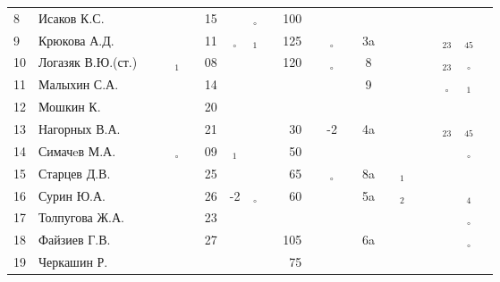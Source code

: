 \documentclass[a4paper,landscape,11pt]{article}
\newcommand*\OK{&\small \ding{51}$\!\!_\circ$} %
\newcommand*\Ok{&\small \ding{51}$\!\!_\circ$} %
\newcommand*\ok{&{\small\ding{51}}} %
\newcommand*\no{&{\small }} %
\newcommand*\da{&{\small\ding{48}$\!\!_1$}} %
\newcommand*\db{&{\small\ding{48}$\!\!_2$}} %
\newcommand*\bc{&{\small\ding{48}$\!\!_{23}$}} %
\newcommand*\dd{&{\small\ding{48}$\!\!_4$}} %
\newcommand*\De{&{\small\ding{48}$\!\!_{45}$}} %
\begin{document}
\begin{tabular}{l|l|ccccccccrccccccccccc}
 8& Исаков К.С.      \ok\ok\ok\ok&15\no\OK\ok&100\no\ok\ok \no\no\no\no\ok\no\no\no\\
 9& Крюкова А.Д.     \ok\ok\ok\ok&11\OK\da\ok&125\ok\Ok\ok& 3a\ok\ok\ok\ok\bc\De\ok\\
10& Логазяк В.Ю.(ст.)\ok\ok\da\ok&08\no\ok\ok&120\ok\Ok\ok&  8\ok\ok\ok\ok\bc\Ok\ok\\
\midrule
11& Малыхин С.А.     \ok\no\ok\ok&14\no\no\no \no\no\ok\ok&  9\no\no\no\ok\Ok\da\ok\\
12& Мошкин К.        \ok\ok\ok\ok&20\ok\no\no \no\no\no\ok \no\no\no\no\no\no\no\no\\
13& Нагорных В.А.    \ok\ok\ok\ok&21\ok\ok\ok& 30\ok&-2\ok& 4a\ok\ok\ok\ok\bc\De\ok\\
14& Симачeв М.А.     \ok\ok\OK\ok&09\da\no\no& 50\no\no\no \no\no\ok\ok\ok\no\Ok\ok\\
15& Старцев Д.В.     \ok\ok\ok\ok&25\ok\ok\ok& 65\ok\Ok\ok& 8a\ok\da\ok\ok\ok\ok\ok\\
16& Сурин Ю.А.       \ok\ok\ok\ok&26&-2\OK\ok& 60\ok\ok\ok& 5a\ok\db\ok\ok\no\dd\ok\\
17& Толпугова Ж.А.   \no\no\no\no&23\ok\no\no \no\no\no\no \no\no\ok\ok\no\ok\Ok\ok\\
18& Файзиев Г.В.     \ok\ok\ok\ok&27\ok\ok\ok&105\ok\ok\ok& 6a\ok\no\ok\ok\ok\Ok\ok\\
19& Черкашин Р.      \ok\ok\ok\ok\no\no\no\no& 75\no\ok\ok \no\no\no\no\no\no\no\no\\ 
\bottomrule
\end{tabular} 
\end{document}
